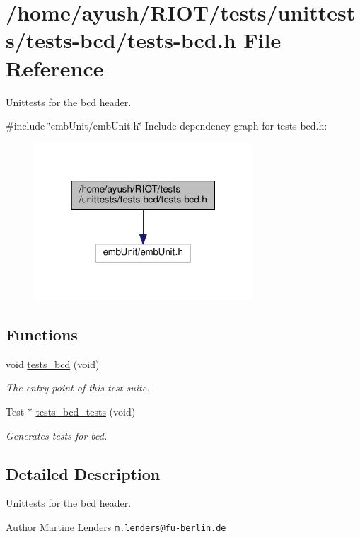 \hypertarget{tests-bcd_8h}{}\section{/home/ayush/\+R\+I\+O\+T/tests/unittests/tests-\/bcd/tests-\/bcd.h File Reference}
\label{tests-bcd_8h}


Unittests for the {\ttfamily bcd} header.  


{\ttfamily \#include \char`\"{}emb\+Unit/emb\+Unit.\+h\char`\"{}}\newline
Include dependency graph for tests-\/bcd.h\+:
\nopagebreak
\begin{figure}[H]
\begin{center}
\leavevmode
\includegraphics[width=232pt]{tests-bcd_8h__incl}
\end{center}
\end{figure}
\subsection*{Functions}
\begin{DoxyCompactItemize}
\item 
void \hyperlink{group__unittests_ga743f1615d5742924d9f921a17fe159a6}{tests\+\_\+bcd} (void)
\begin{DoxyCompactList}\small\item\em The entry point of this test suite. \end{DoxyCompactList}\item 
Test $\ast$ \hyperlink{group__unittests_ga67d8fcec140a78689e78a00ba4b2582e}{tests\+\_\+bcd\+\_\+tests} (void)
\begin{DoxyCompactList}\small\item\em Generates tests for bcd. \end{DoxyCompactList}\end{DoxyCompactItemize}


\subsection{Detailed Description}
Unittests for the {\ttfamily bcd} header. 

\begin{DoxyAuthor}{Author}
Martine Lenders \href{mailto:m.lenders@fu-berlin.de}{\tt m.\+lenders@fu-\/berlin.\+de} 
\end{DoxyAuthor}
